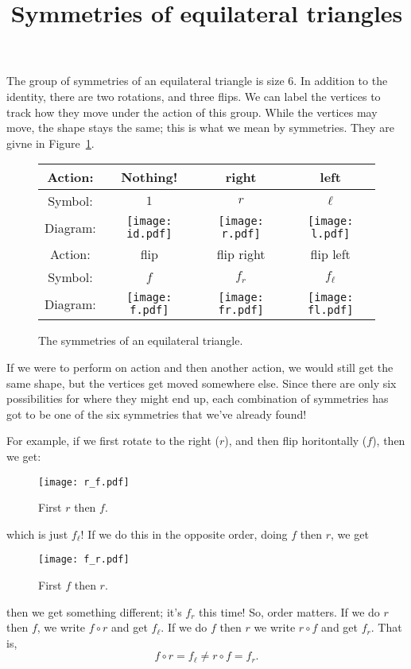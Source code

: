 \documentclass[12pt]{article}
\title{Symmetries of equilateral triangles}
\begin{document}
\thispagestyle{empty}

\maketitle

The group of symmetries of an equilateral triangle is size 6.  In
addition to the identity, there are two rotations, and three flips.
We can label the vertices to track how they move under the action of
this group.  While the vertices may move, the shape stays the same; this
is what we mean by symmetries.  They are givne in Figure~\ref{trisym}.
\begin{figure}[h]
   \centering
   \begin{tabular}{|c|c|c|c|}
     \hline Action: & Nothing! & right & left  \\
     \hline
     Symbol: & $1$ & $r$ & $\ell$  \\
     \hline
     Diagram: &
     \texttt{[image: id.pdf]} &
     \texttt{[image: r.pdf]}  &
     \texttt{[image: l.pdf]} \\
     \hline
     \hline Action: & flip & flip right & flip left \\
     \hline
     Symbol: & $f$ & $f_r$ & $f_\ell$ \\
     \hline
     Diagram: &
     \texttt{[image: f.pdf]}  &
     \texttt{[image: fr.pdf]} &
     \texttt{[image: fl.pdf]}\\
     \hline
   \end{tabular}
   \caption{The symmetries of an equilateral triangle.}
  \label{trisym}
\end{figure}

If we were to perform on action and then another action, we would
still get the same shape, but the vertices get moved somewhere else.
Since there are only six possibilities for where they might end up,
each combination of symmetries has got to be one of the six symmetries
that we've already found!

For example, if we first rotate to the right ($r$), and then flip
horitontally ($f$), then we get:
\begin{figure}[h]
  \centering
  \texttt{[image: r\_f.pdf]}
  \caption{First $r$ then $f$.}
\end{figure}
which is just $f_\ell$!  If we do this in the opposite order, doing $f$
then $r$, we get
\begin{figure}[h]
  \centering
  \texttt{[image: f\_r.pdf]}
  \caption{First $f$ then $r$.}
\end{figure}
then we get something different; it's $f_r$ this time!  So, order
matters.  If we do $r$ then $f$, we write $f\circ{}r$ and get
$f_\ell$.  If we do $f$ then $r$ we write $r\circ{}f$ and get $f_r$.
That is,
\begin{equation}
  \label{frrf}
  f \circ r = f_\ell \neq r \circ f = f_r.
\end{equation}
\end{document}
